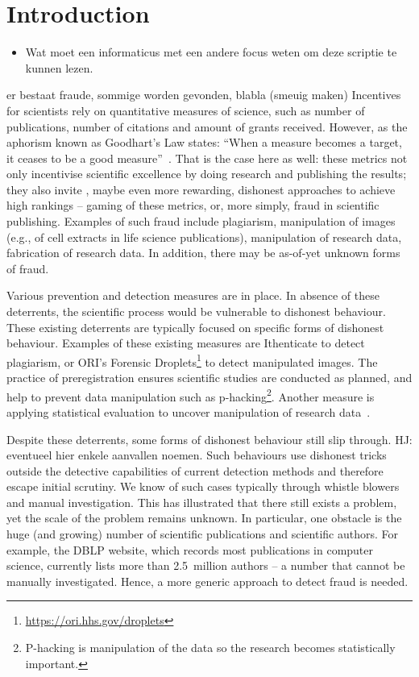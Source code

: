 \documentclass{ou-report}
\newcommand{\HJ}[1]{{\color{red} HJ: #1}}
\newcommand{\outline}[1]{{\color{blue} #1}}
\begin{document}
\chapter{Introduction}
\outline{
\begin{itemize}
    \item Wat moet een informaticus met een andere focus weten om deze scriptie 
        te kunnen lezen.
\end{itemize}
}
\outline{
    er bestaat fraude, sommige worden gevonden, blabla (smeuig maken)
}
Incentives for scientists rely on quantitative measures of science, such as 
number of publications, number of citations and amount of grants received. 
However, as the aphorism known as Goodhart's Law states: ``When a measure 
becomes a target, it ceases to be a good measure''~\cite{strathern_1997}. That 
is the case here as well: these metrics not only incentivise scientific 
excellence by doing research and publishing the results; they also invite 
, maybe even more rewarding, dishonest approaches to achieve high rankings 
-- gaming of these metrics, or, more simply, fraud in scientific publishing. 
Examples of such fraud include plagiarism, manipulation of images (e.g., of cell 
extracts in life science publications), manipulation of research data, 
fabrication of research data. In addition, there may be as-of-yet unknown forms 
of fraud.

Various prevention and detection measures are in place. In absence of these 
deterrents, the scientific process would be vulnerable to dishonest behaviour. 
These existing deterrents are typically focused on specific forms of dishonest 
behaviour. Examples of these existing measures are Ithenticate to detect 
plagiarism, or ORI's Forensic Droplets\footnote{\url{https://ori.hhs.gov/droplets}} 
to detect manipulated images. The practice of preregistration ensures scientific 
studies are conducted as planned, and help to prevent data manipulation such as 
p-hacking\footnote{P-hacking is manipulation of the data so the research becomes 
statistically important.}. Another measure is applying statistical evaluation to 
uncover manipulation of research data~\cite{HGWA2019}. 

Despite these deterrents, some forms of dishonest behaviour still slip through.
\HJ{eventueel hier enkele aanvallen noemen.}
Such behaviours use dishonest tricks outside the detective capabilities of
current detection methods and therefore escape initial scrutiny. We know of
such cases typically through whistle blowers and manual investigation. 
This has illustrated that there still exists a problem, yet the scale of the
problem remains unknown.
In particular, one obstacle is the huge (and growing) number of scientific 
publications and scientific authors. For example, the DBLP website, which 
records most publications in computer science, currently lists more than 
2.5~million authors -- a number that cannot be manually investigated. Hence, a 
more generic approach to detect fraud is needed. 
\end{document}
